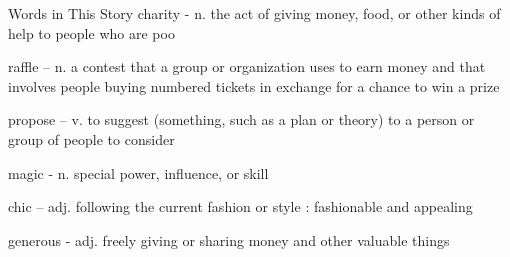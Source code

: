 \underline{                                                                                                 }

Words in This Story
charity - n. the act of giving money, food, or other kinds of help to people who are poo

raffle – n. a contest that a group or organization uses to earn money and that involves people buying numbered tickets in exchange for a chance to win a prize

propose – v. to suggest (something, such as a plan or theory) to a person or group of people to consider

magic - n. special power, influence, or skill

chic – adj. following the current fashion or style : fashionable and appealing

generous - adj. freely giving or sharing money and other valuable things
